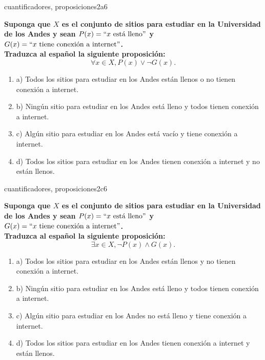 \documentclass{article}
\begin{document}
\begin{question}{31}{cuantificadores, proposiciones}{2}{a}{6}{
\textbf{Suponga que $X$ es el conjunto de sitios para estudiar en la Universidad de los Andes y sean $P(x)=``x\text{ está lleno}"$ y $G(x)=``x\text{ tiene conexión a internet}"$.}\\

\textbf{Traduzca al español la siguiente proposición:}
\[
\forall x \in X, P(x) \lor \neg G(x).
\]

\begin{enumerate}
    \item a) Todos los sitios para estudiar en los Andes están llenos o no tienen conexión a internet.
    \item b) Ningún sitio para estudiar en los Andes está lleno y todos tienen conexión a internet.
    \item c) Algún sitio para estudiar en los Andes está vacío y tiene conexión a internet.
    \item d) Todos los sitios para estudiar en los Andes tienen conexión a internet y no están llenos.
\end{enumerate}
}
\end{question}

\begin{question}{32}{cuantificadores, proposiciones}{2}{c}{6}{
\textbf{Suponga que $X$ es el conjunto de sitios para estudiar en la Universidad de los Andes y sean $P(x)=``x\text{ está lleno}"$ y $G(x)=``x\text{ tiene conexión a internet}"$.}\\

\textbf{Traduzca al español la siguiente proposición:}
\[
\exists x \in X, \neg P(x) \land G(x).
\]

\begin{enumerate}
    \item a) Todos los sitios para estudiar en los Andes están llenos y no tienen conexión a internet.
    \item b) Ningún sitio para estudiar en los Andes está lleno y todos tienen conexión a internet.
    \item c) Algún sitio para estudiar en los Andes no está lleno y tiene conexión a internet.
    \item d) Todos los sitios para estudiar en los Andes tienen conexión a internet y están llenos.
\end{enumerate}
}
\end{question}
\end{document}

